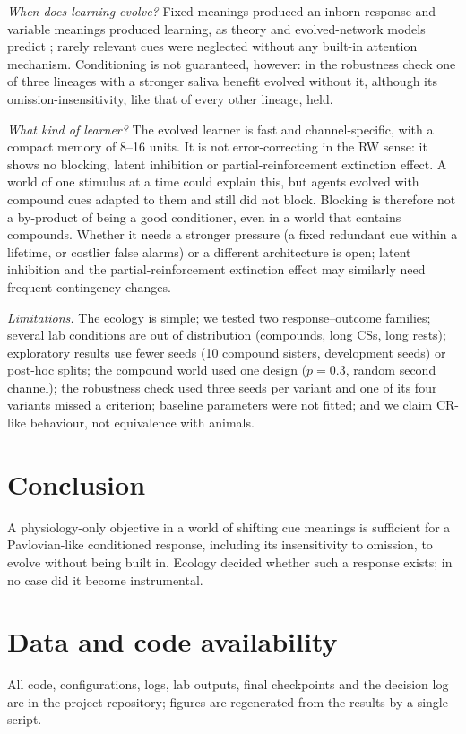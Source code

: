 \documentclass[conference]{IEEEtran}
\begin{document}
\textit{When does learning evolve?} Fixed meanings produced an inborn response and variable meanings produced learning, as theory and evolved-network models predict \cite{stephens91,kozielska24}; rarely relevant cues were neglected without any built-in attention mechanism. Conditioning is not guaranteed, however: in the robustness check one of three lineages with a stronger saliva benefit evolved without it, although its omission-insensitivity, like that of every other lineage, held.

\textit{What kind of learner?} The evolved learner is fast and channel-specific, with a compact memory of 8--16 units. It is not error-correcting in the RW sense: it shows no blocking, latent inhibition or partial-reinforcement extinction effect. A world of one stimulus at a time could explain this, but agents evolved with compound cues adapted to them and still did not block. Blocking is therefore not a by-product of being a good conditioner, even in a world that contains compounds. Whether it needs a stronger pressure (a fixed redundant cue within a lifetime, or costlier false alarms) or a different architecture is open; latent inhibition and the partial-reinforcement extinction effect may similarly need frequent contingency changes.

\textit{Limitations.} The ecology is simple; we tested two response--outcome families; several lab conditions are out of distribution (compounds, long CSs, long rests); exploratory results use fewer seeds (10 compound sisters, development seeds) or post-hoc splits; the compound world used one design ($p=0.3$, random second channel); the robustness check used three seeds per variant and one of its four variants missed a criterion; baseline parameters were not fitted; and we claim CR-like behaviour, not equivalence with animals.

\section{Conclusion}
A physiology-only objective in a world of shifting cue meanings is sufficient for a Pavlovian-like conditioned response, including its insensitivity to omission, to evolve without being built in. Ecology decided whether such a response exists; in no case did it become instrumental.

\section*{Data and code availability}
All code, configurations, logs, lab outputs, final checkpoints and the decision log are in the project repository; figures are regenerated from the results by a single script.
\end{document}
